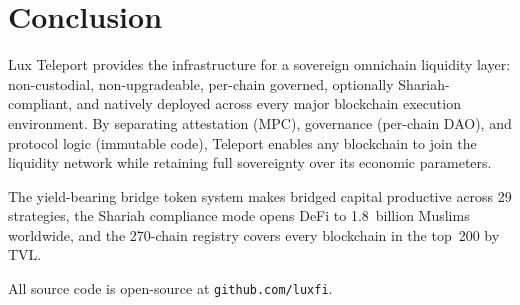 \section{Conclusion}

\label{sec:conclusion}

Lux Teleport provides the infrastructure for a sovereign omnichain liquidity layer: non-custodial, non-upgradeable, per-chain governed, optionally Shariah-compliant, and natively deployed across every major blockchain execution environment. By separating attestation (MPC), governance (per-chain DAO), and protocol logic (immutable code), Teleport enables any blockchain to join the liquidity network while retaining full sovereignty over its economic parameters.

The yield-bearing bridge token system makes bridged capital productive across 29 strategies, the Shariah compliance mode opens DeFi to 1.8~billion Muslims worldwide, and the 270-chain registry covers every blockchain in the top~200 by TVL.

All source code is open-source at \texttt{github.com/luxfi}.

